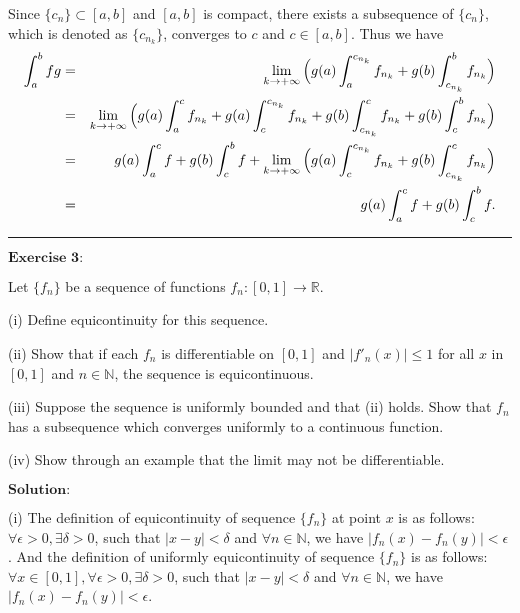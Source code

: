 \documentclass[12pt,a4paper]{ctexart}
\begin{document}
Since $\{c_{n}\} \subset [a, b]$ and $[a, b]$ is compact, there exists a subsequence of $\{c_{n}\}$, which is denoted as $\{c_{n_{k}}\}$, converges to $c$ and $c \in [a, b]$. Thus we have
\begin{eqnarray*}
\int_{a}^{b} f g & = & \lim_{k \to + \infty} \Big{(} g(a) \int_{a}^{c_{n_{k}}} f_{n_{k}} + g(b) \int_{c_{n_{k}}}^{b} f_{n_{k}} \Big{)} \\
& = & \lim_{k \to + \infty} \Big{(} g(a) \int_{a}^{c} f_{n_{k}} + g(a) \int_{c}^{c_{n_{k}}} f_{n_{k}} + g(b) \int_{c_{n_{k}}}^{c} f_{n_{k}} + g(b) \int_{c}^{b} f_{n_{k}} \Big{)} \\
& = &  g(a) \int_{a}^{c} f + g(b) \int_{c}^{b} f + \lim_{k \to + \infty} \Big{(} g(a) \int_{c}^{c_{n_{k}}} f_{n_{k}} +  g(b) \int_{c_{n_{k}}}^{c} f_{n_{k}} \Big{)} \\
& = & g(a) \int_{a}^{c} f + g(b) \int_{c}^{b} f.
\end{eqnarray*}

\noindent\rule[0.25\baselineskip]{\textwidth}{0.5pt}

\vspace{8pt}

$\textbf{Exercise 3:}$

Let $\{f_{n}\}$ be a sequence of functions $f_{n}: [0, 1] \rightarrow \mathbb{R}$.

(i) Define equicontinuity for this sequence.

(ii) Show that if each $f_{n}$ is differentiable on $[0, 1]$ and $|f'_{n}(x)| \leq 1$ for all $x$ in $[0, 1]$ and $n \in \mathbb{N}$, the sequence is equicontinuous.

(iii) Suppose the sequence is uniformly bounded and that (ii) holds. Show that $f_{n}$ has a subsequence which converges uniformly to a continuous function.

(iv) Show through an example that the limit may not be differentiable.

\vspace{8pt}
$\textbf{Solution:}$

(i) The definition of equicontinuity of sequence $\{f_{n}\}$ at point $x$ is as follows: $\forall \epsilon > 0, \exists \delta > 0$, such that $|x - y| < \delta$ and $\forall n \in \mathbb{N}$, we have $|f_{n}(x) - f_{n}(y)| < \epsilon$. And the definition of uniformly equicontinuity of sequence $\{f_{n}\}$ is as follows:
 $\forall x \in [0, 1], \forall \epsilon > 0, \exists \delta > 0$, such that $|x - y| < \delta$ and $\forall n \in \mathbb{N}$, we have $|f_{n}(x) - f_{n}(y)| < \epsilon$.
\end{document}
